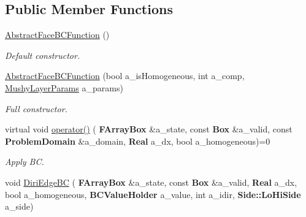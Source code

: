 \subsection*{Public Member Functions}
\begin{DoxyCompactItemize}
\item 
\mbox{\label{class_abstract_face_b_c_function_afab41831f92499fc4d586c15c04a65e7}} 
\hyperlink{class_abstract_face_b_c_function_afab41831f92499fc4d586c15c04a65e7}{Abstract\+Face\+B\+C\+Function} ()
\begin{DoxyCompactList}\small\item\em Default constructor. \end{DoxyCompactList}\item 
\mbox{\label{class_abstract_face_b_c_function_a3a4587e8021aa687ad3903f99e415e1f}} 
\hyperlink{class_abstract_face_b_c_function_a3a4587e8021aa687ad3903f99e415e1f}{Abstract\+Face\+B\+C\+Function} (bool a\+\_\+is\+Homogeneous, int a\+\_\+comp, \hyperlink{class_mushy_layer_params}{Mushy\+Layer\+Params} a\+\_\+params)
\begin{DoxyCompactList}\small\item\em Full constructor. \end{DoxyCompactList}\item 
\mbox{\label{class_abstract_face_b_c_function_a7a864bc2f35778cd44d812c5c86db04b}} 
virtual void \hyperlink{class_abstract_face_b_c_function_a7a864bc2f35778cd44d812c5c86db04b}{operator()} (\textbf{ F\+Array\+Box} \&a\+\_\+state, const \textbf{ Box} \&a\+\_\+valid, const \textbf{ Problem\+Domain} \&a\+\_\+domain, \textbf{ Real} a\+\_\+dx, bool a\+\_\+homogeneous)=0
\begin{DoxyCompactList}\small\item\em Apply BC. \end{DoxyCompactList}\item 
void \hyperlink{class_abstract_face_b_c_function_a176156d1142b51236652bbde0dee520a}{Diri\+Edge\+BC} (\textbf{ F\+Array\+Box} \&a\+\_\+state, const \textbf{ Box} \&a\+\_\+valid, \textbf{ Real} a\+\_\+dx, bool a\+\_\+homogeneous, \textbf{ B\+C\+Value\+Holder} a\+\_\+value, int a\+\_\+idir, \textbf{ Side\+::\+Lo\+Hi\+Side} a\+\_\+side)
\item 
\mbox{\label{class_abstract_face_b_c_function_a8a2f9d7139561aebae6dfd424d824fdb}} 

\end{DoxyCompactItemize}
